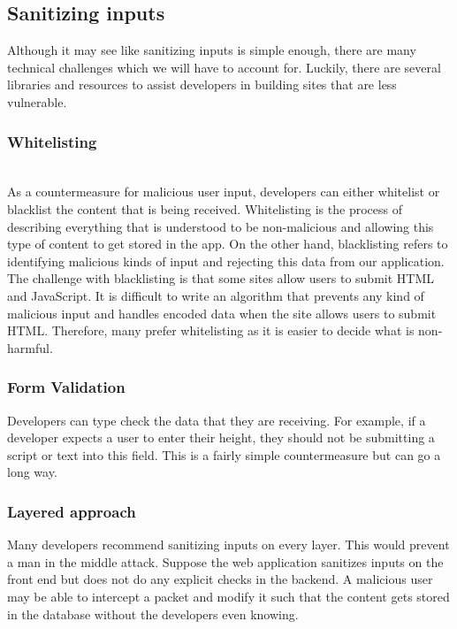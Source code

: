 \documentclass[conference]{IEEEtran}
\begin{document}
\subsection{Sanitizing inputs}

Although it may see like sanitizing inputs is simple enough, there are many technical challenges which we will have to account for. Luckily, there are several libraries and resources to assist developers in building sites that are less vulnerable.\\

\subsubsection{Whitelisting}\\

As a countermeasure for malicious user input, developers can either whitelist or blacklist the content that is being received. Whitelisting is the process of describing everything that is understood to be non-malicious and allowing this type of content to get stored in the app. On the other hand, blacklisting refers to identifying malicious kinds of input and rejecting this data from our application. The challenge with blacklisting is that some sites allow users to submit HTML and JavaScript. It is difficult to write an algorithm that prevents any kind of malicious input and handles encoded data when the site allows users to submit HTML. Therefore, many prefer whitelisting as it is easier to decide what is non-harmful.\\ 
\subsubsection {Form Validation}
Developers can type check the data that they are receiving. For example, if a developer expects a user to enter their height, they should not be submitting a script or text into this field. This is a fairly simple countermeasure but can go a long way.\\
\subsubsection{Layered approach}
Many developers recommend sanitizing inputs on every layer. This would prevent a man in the middle attack. Suppose the web application sanitizes inputs on the front end but does not do any explicit checks in the backend. A malicious user may be able to intercept a packet and modify it such that the content gets stored in the database without the developers even knowing.\\
\end{document}
